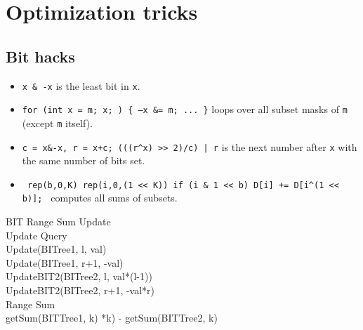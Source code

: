 

\section{Optimization tricks}
\subsection{Bit hacks}
\begin{itemize}
	\item \texttt{x \& -x} is the least bit in \texttt{x}.
	\item \texttt{for (int x = m; x; ) \{ --x \&= m; ... \}} loops over all subset masks of \texttt{m} (except \texttt{m} itself).
	\item \texttt{c = x\&-x, r = x+c; (((r\^{}x) >> 2)/c) | r} is the next number after \texttt{x} with the same number of bits set.
	\item \texttt{ rep(b,0,K) rep(i,0,(1 << K)) if (i \& 1 << b) D[i] += D[i\^{}(1 << b)]; } computes all sums of subsets.
\end{itemize}


BIT Range Sum Update \\ 
Update Query \\
Update(BITree1, l, val) \\ 
Update(BITree1, r+1, -val) \\ 
UpdateBIT2(BITree2, l, val*(l-1)) \\ 
UpdateBIT2(BITree2, r+1, -val*r) \\

Range Sum \\
getSum(BITTree1, k) *k) - getSum(BITTree2, k) \\ 

